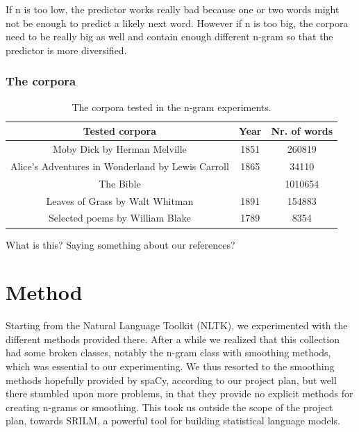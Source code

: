 \documentclass[a4paper,12pt]{article}
\begin{document}
	If n is too low, the predictor works really bad because one or two words might not be enough to predict a likely next word. However if n is too big, the corpora need to be really big as well and contain enough different n-gram so that the predictor is more diversified.

\subsubsection{The corpora}

\begin{table}
\begin{center}
\begin{tabular}{|c|c|c|}
\hline
Tested corpora & Year & Nr. of words \\ \hline
Moby Dick by Herman Melville & 1851 & 260819\\ \hline
Alice's Adventures in Wonderland by Lewis Carroll & 1865 & 34110 \\ \hline
The Bible & & 1010654 \\ \hline
Leaves of Grass by Walt Whitman & 1891 & 154883\\ \hline
Selected poems by William Blake & 1789 & 8354 \\ \hline
\end{tabular}
\caption{The corpora tested in the n-gram experiments.}
\label{tab:results}
\end{center}
\end{table}


What is this? Saying something about our references?

\section{Method}
\label{sec:method}

Starting from the Natural Language Toolkit (NLTK), we experimented with the different methods provided there. After a while we realized that this collection had some broken classes, notably the n-gram class with smoothing methods, which was essential to our experimenting. We thus resorted to the smoothing methods hopefully provided by spaCy, according to our project plan, but well there stumbled upon more problems, in that they provide no explicit methods for creating n-grams or smoothing. This took us outside the scope of the project plan, towards SRILM, a powerful tool for building statistical language models.
\end{document}
